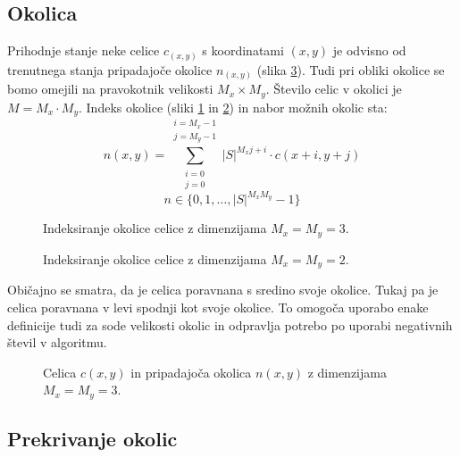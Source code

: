\documentclass[12pt,a4paper,openany,twoside]{book}
\begin{document}
\subsection{Okolica}

Prihodnje stanje neke celice \(c_(x,y)\) s koordinatami \((x,y)\)
je odvisno od trenutnega stanja pripadajoče okolice \(n_(x,y)\) (slika \ref{neighborhood}).
Tudi pri obliki okolice se bomo omejili na pravokotnik velikosti \(M_x \times M_y\).
Število celic v okolici je \(M=M_x \cdot M_y\).
Indeks okolice (sliki \ref{neighborhood_index_moore} in \ref{neighborhood_index_quad})
in nabor možnih okolic sta:
\begin{equation}
n(x,y) = \sum_{\substack{i=0 \\ j=0}}^{\substack{i=M_x-1 \\ j=M_y-1}} |S|^{M_x j + i} \cdot c(x+i,y+j)
\end{equation}
\begin{equation}
n \in \{0, 1, \ldots, |S|^{M_x M_y}-1\}
\end{equation}

\begin{figure}[htb]
\centerline{}
\caption[Indeksiranje okolice \(3 \times 3\).]{Indeksiranje okolice celice z dimenzijama \(M_x=M_y=3\).}
\label{neighborhood_index_moore}
\end{figure}

\begin{figure}[htb]
\centerline{}
\caption[Indeksiranje okolice \(2 \times 2\).]{Indeksiranje okolice celice z dimenzijama \(M_x=M_y=2\).}
\label{neighborhood_index_quad}
\end{figure}

Običajno se smatra, da je celica poravnana s sredino svoje okolice.
Tukaj pa je celica poravnana v levi spodnji kot svoje okolice.
To omogoča uporabo enake definicije tudi za sode velikosti okolic in
odpravlja potrebo po uporabi negativnih števil v algoritmu.

\begin{figure}[htb]
\centerline{}
\caption[Celica in pripadajoča okolica.]{Celica \(c(x,y)\) in pripadajoča okolica \(n(x,y)\) z dimenzijama \(M_x=M_y=3\).}
\label{neighborhood}
\end{figure}

\subsection{Prekrivanje okolic}
\end{document}
